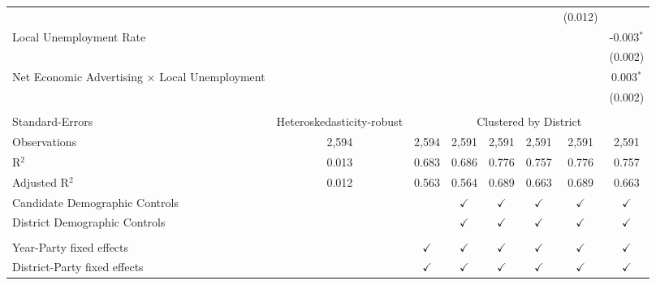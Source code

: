 \begin{table}[htbp]
\begin{tabular}{lccccccc}
                                                    &               &               &               &               &               & (0.012)       &   \\   
      Local Unemployment Rate                       &               &               &               &               &               &               & -0.003$^{*}$\\   
                                                    &               &               &               &               &               &               & (0.002)\\   
      Net Economic Advertising × Local Unemployment &               &               &               &               &               &               & 0.003$^{*}$\\   
                                                    &               &               &               &               &               &               & (0.002)\\   
       \\
      Standard-Errors & Heteroskedasticity-robust & \multicolumn{6}{c}{Clustered by District} \\ 
      Observations                                  & 2,594         & 2,594         & 2,591         & 2,591         & 2,591         & 2,591         & 2,591\\  
      R$^2$                                         & 0.013         & 0.683         & 0.686         & 0.776         & 0.757         & 0.776         & 0.757\\  
      Adjusted R$^2$                                & 0.012         & 0.563         & 0.564         & 0.689         & 0.663         & 0.689         & 0.663\\  
      Candidate Demographic Controls                &               &               & $\checkmark$  & $\checkmark$  & $\checkmark$  & $\checkmark$  & $\checkmark$\\   
      District Demographic Controls                 &               &               & $\checkmark$  & $\checkmark$  & $\checkmark$  & $\checkmark$  & $\checkmark$\\   
       \\
      Year-Party fixed effects                      &               & $\checkmark$  & $\checkmark$  & $\checkmark$  & $\checkmark$  & $\checkmark$  & $\checkmark$\\   
      District-Party fixed effects                  &               & $\checkmark$  & $\checkmark$  & $\checkmark$  & $\checkmark$  & $\checkmark$  & $\checkmark$\\   
      \bottomrule
   \end{tabular}
   

\end{table}

